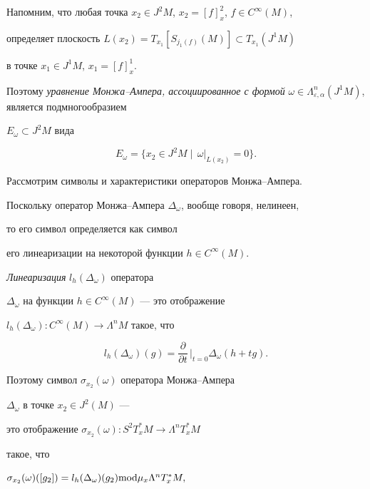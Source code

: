 Напомним, что любая точка $x_2\in J^2M$, $x_2=[f]_x^2$, $f\in C^\infty (M)$,


определяет плоскость $L(x_2)=T_{x_1}[S_{j_1(f)}(M)]\subset T_{x_1}(J^1M)$


в точке $x_1\in J^1M$, $x_1=[f]_x^1$.





Поэтому {\em уравнение Монжа--Ампера, ассоциированное с формой} $\omega \in


\Lambda_{\varepsilon ,\alpha }^n(J^1M)$, является подмногообразием


$E_\omega \subset J^2M$ вида


$$


E_\omega =\{x_2\in J^2M\mid\,\omega |_{L(x_2)}=0\}.


$$





Рассмотрим символы и характеристики операторов Монжа--Ампера.


Поскольку оператор Монжа--Ампера $\Delta_\omega$, вообще говоря, нелинеен,


то его символ определяется как символ


его линеаризации на некоторой функции $h\in C^\infty (M)$.





{\em Линеаризация} $l_h(\Delta_\omega )$ оператора


$\Delta_\omega$ на функции $h\in C^\infty (M)$ --- это отображение


$l_h(\Delta_\omega):C^\infty (M)\to \Lambda^nM$ такое, что


$$


l_h(\Delta_\omega)(g)=\frac{\partial}{\partial t}\,\bigg|_{t=0}\Delta_\omega


(h+tg). 


$$





Поэтому символ $\sigma_{x_2}(\omega )$ оператора Монжа--Ампера


$\Delta_\omega $ в точке $x_2\in J^2(M)$ ---


это отображение $\sigma_{x_2}(\omega):S^2T_x^{*}M\to \Lambda^nT_x^{*}M$


такое, что


$\sigma_{x_2}(\omega )([g_2])=


l_h(\Delta_\omega)(g_2){\Mod}\mu_x\Lambda^nT_x^{*}M,$


